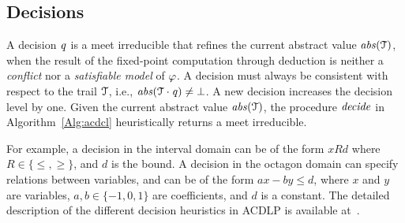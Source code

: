 \subsection{Decisions}\label{sec:decide}
%
A decision $\mathit{q}$ is a meet irreducible that refines the
current abstract value $\mathit{abs}(\mathcal{T})$, when the result of the fixed-point 
computation through deduction is neither a {\em conflict} nor a {\em 
satisfiable model} 
of $\varphi$.  A decision must always be consistent 
with respect to the trail $\mathcal{T}$, 
i.e., $\mathit{abs}(\mathcal{T}\cdot \mathit{q})\neq \bot$.  A new 
decision increases the decision level by one. Given the 
current abstract value $\mathit{abs}(\mathcal{T})$, the procedure $\mathit{decide}$ 
in Algorithm~\ref{Alg:acdcl} heuristically returns a meet irreducible.


%
For example, a decision in the interval domain can be of the form 
$x R d$ where $R \in \{\leq,\allowbreak\geq\}$, and $d$ 
is the bound.  A decision in the octagon domain can specify relations 
between variables, and can be of the form $ax - by \leq d$, where 
$x$ and $y$ are variables, $a,b \in \{-1,0,1\}$ are coefficients, 
and $d$ is a constant.  The detailed description of the different 
decision heuristics in ACDLP is available at~\cite{extended}.

%

%

